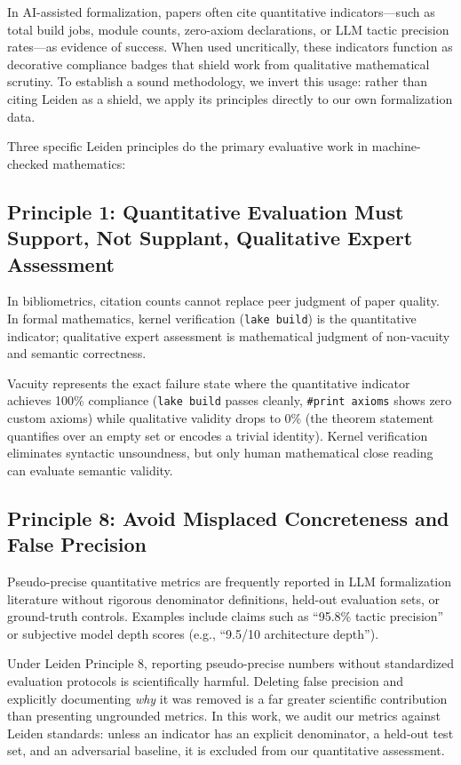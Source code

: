 \documentclass[11pt,a4paper]{article}
\theoremstyle{definition}
\theoremstyle{remark}
\begin{document}
In AI-assisted formalization, papers often cite quantitative indicators---such as total build jobs, module counts, zero-axiom declarations, or LLM tactic precision rates---as evidence of success. When used uncritically, these indicators function as decorative compliance badges that shield work from qualitative mathematical scrutiny. To establish a sound methodology, we invert this usage: rather than citing Leiden as a shield, we apply its principles directly to our own formalization data.

Three specific Leiden principles do the primary evaluative work in machine-checked mathematics:

\subsection{Principle 1: Quantitative Evaluation Must Support, Not Supplant, Qualitative Expert Assessment}

In bibliometrics, citation counts cannot replace peer judgment of paper quality. In formal mathematics, kernel verification (\texttt{lake build}) is the quantitative indicator; qualitative expert assessment is mathematical judgment of non-vacuity and semantic correctness.

Vacuity represents the exact failure state where the quantitative indicator achieves 100\% compliance (\texttt{lake build} passes cleanly, \texttt{\#print axioms} shows zero custom axioms) while qualitative validity drops to 0\% (the theorem statement quantifies over an empty set or encodes a trivial identity). Kernel verification eliminates syntactic unsoundness, but only human mathematical close reading can evaluate semantic validity.

\subsection{Principle 8: Avoid Misplaced Concreteness and False Precision}

Pseudo-precise quantitative metrics are frequently reported in LLM formalization literature without rigorous denominator definitions, held-out evaluation sets, or ground-truth controls. Examples include claims such as ``95.8\% tactic precision'' or subjective model depth scores (e.g., ``9.5/10 architecture depth''). 

Under Leiden Principle 8, reporting pseudo-precise numbers without standardized evaluation protocols is scientifically harmful. Deleting false precision and explicitly documenting \emph{why} it was removed is a far greater scientific contribution than presenting ungrounded metrics. In this work, we audit our metrics against Leiden standards: unless an indicator has an explicit denominator, a held-out test set, and an adversarial baseline, it is excluded from our quantitative assessment.
\end{document}
